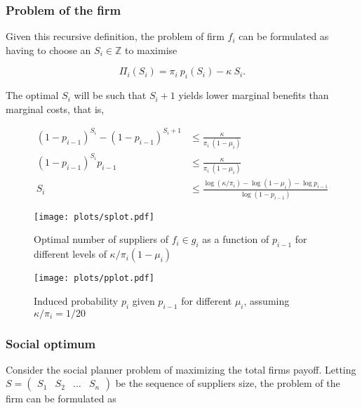 \documentclass[american, abstract=on]{scrartcl}
\begin{document}
\subsubsection{Problem of the firm}

Given this recursive definition, the problem of firm $f_i$ can be formulated as having to choose an $S_i \in \mathbb{Z}$ to maximise

\begin{equation}
  \Pi_i(S_i) = \pi_i \ p_i(S_i) - \kappa \ S_i.
\end{equation}

The optimal $S_i$ will be such that $S_i + 1$ yields lower marginal benefits than marginal costs, that is,

\begin{equation}
  \begin{split}
    (1 - p_{i-1})^{S_i} - (1 - p_{i-1})^{S_i + 1} &\leq \frac{\kappa}{\pi_i \ (1 - \mu_i)} \\
    (1 - p_{i-1})^{S_i} p_{i - 1} &\leq \frac{\kappa}{\pi_i \ (1 - \mu_i)} \\
    S_i&\leq \frac{\log\left( \kappa / \pi_i \right) - \log(1 - \mu_i) - \log p_{i - 1}}{\log(1 - p_{i-1})}
  \end{split}
\end{equation}

\begin{figure}[H]
  \centering
  \texttt{[image: plots/splot.pdf]} 
  \caption{Optimal number of suppliers of $f_i \in g_i$ as a function of $p_{i - 1}$ for different levels of $\kappa \Big/ \pi_i (1 - \mu_i)$}
  \label{fig:splot}
\end{figure}

\begin{figure}[H]
  \centering
  \texttt{[image: plots/pplot.pdf]} 
  \caption{Induced probability $p_i$ given $p_{i - 1}$ for different $\mu_i$, assuming $\kappa / \pi_i = 1/20$}
  \label{fig:pplot}
\end{figure}

\subsubsection{Social optimum}

Consider the social planner problem of maximizing the total firms payoff. Letting $S = \begin{pmatrix} S_1 & S_2 & \ldots & S_n \end{pmatrix}$ be the sequence of suppliers size, the problem of the firm can be formulated as
\end{document}
